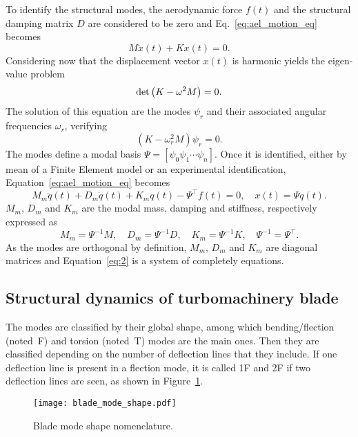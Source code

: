 To identify the structural modes, the aerodynamic force $f(t)$ and
the structural damping matrix $D$ are considered to be zero
and Eq.~\eqref{eq:ael_motion_eq} becomes
\begin{equation}
	M \ddot{x}(t) + K x(t) = 0.
	\label{eq:ael_motion_eq_free_response}
\end{equation}
Considering now that the displacement vector $x(t)$ is harmonic
yields the eigen-value problem
\begin{equation}
	\mdet \left(K - \omega^2 M  \right) = 0.
	\label{eq:ael_motion_eq_eigen_value}
\end{equation}
The solution of this equation are the modes $\psi_r$
and their associated angular frequencies $\omega_r$, verifying
\begin{equation}
	\left(K - \omega_r^2 M  \right) \psi_r = 0.
\end{equation}
The modes define a modal basis 
$\Psi = [\psi_0 \psi_1 \cdots \psi_n]$.
Once it
is identified, either by mean of a Finite
Element model or an experimental identification, 
Equation~\eqref{eq:ael_motion_eq} becomes
\begin{equation}
  \label{eq:2}
  M_m \ddot{q}(t) + D_m \dot{q}(t) + K_m q (t) - \Psi^\top f(t)=0, \quad x(t) = \Psi q(t).
\end{equation}
$M_m$, $D_m$ and $K_m$ are the modal mass, 
damping and stiffness, respectively expressed as
\begin{equation}
    M_m = \Psi ^{-1} M, \quad D_m = \Psi ^{-1} D, \quad K_m = \Psi ^{-1} K, \quad \Psi ^{-1}  = \Psi ^\top.
\end{equation}
As the modes are orthogonal by definition,
$M_m$, $D_m$ and $K_m$ are diagonal matrices and
Equation~\eqref{eq:2} is a system of completely  equations.

\subsection{Structural dynamics of turbomachinery blade}
\label{sub:structural_dynamics_of_turbomachinery_blade}

The modes are classified by their global shape, among which 
bending/flection (noted~F) and torsion (noted~T) 
modes are the main ones. Then they are classified
depending on the number of deflection lines that they
include. If one deflection line is present in a flection 
mode, it is called 1F and 2F if two deflection lines are
seen, as shown in Figure~\ref{fig:blade_mode_shape}.
\begin{figure}[htp]
  \centering
  \texttt{[image: blade\_mode\_shape.pdf]}
  \caption{Blade mode shape nomenclature.}
  \label{fig:blade_mode_shape}
\end{figure}

